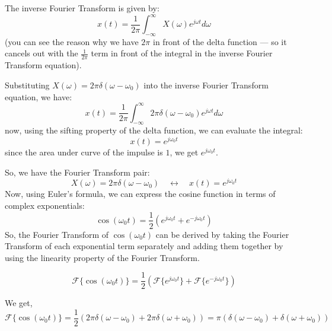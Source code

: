 The inverse Fourier Transform is given by:
\[
x(t) = \frac{1}{2\pi} \int_{-\infty}^{\infty} X(\omega) e^{j \omega t} d\omega
\]
(you can see the reason why we have $2\pi$ in front of the delta function --- so it cancels out with the $\frac{1}{2\pi}$ term in front of the integral in the inverse Fourier Transform equation).

Substituting \( X(\omega) = 2 \pi \delta(\omega - \omega_0) \) into the inverse Fourier Transform equation, we have:
\[
x(t) = \frac{1}{2\pi} \int_{-\infty}^{\infty} 2 \pi \delta(\omega - \omega_0) e^{j \omega t} d\omega
\]
now, using the sifting property of the delta function, we can evaluate the integral:
\[
x(t) = e^{j \omega_0 t}
\]
since the area under curve of the impulse is $1$, we get $e^{j \omega_0 t}$.

So, we have the Fourier Transform pair:
\[
X(\omega) = 2 \pi \delta(\omega - \omega_0) \quad \leftrightarrow \quad x(t) = e^{j \omega_0 t}
\]
Now, using Euler's formula, we can express the cosine function in terms of complex exponentials:
\[
\cos(\omega_0 t) = \frac{1}{2} \left( e^{j \omega_0 t} + e^{-j \omega_0 t} \right)
\]
So, the Fourier Transform of \( \cos(\omega_0 t) \) can be derived by taking the Fourier Transform of each exponential term separately and adding them together by using the linearity property of the Fourier Transform.

\[
\mathcal{F}\{ \cos(\omega_0 t) \} = \frac{1}{2} \left( \mathcal{F}\{ e^{j \omega_0 t} \} + \mathcal{F}\{ e^{-j \omega_0 t} \} \right)
\]

We get, 
\[
\mathcal{F}\{ \cos(\omega_0 t) \} = \frac{1}{2} \left( 2 \pi \delta(\omega - \omega_0) + 2 \pi \delta(\omega + \omega_0) \right) 
= \pi \left( \delta(\omega - \omega_0) + \delta(\omega + \omega_0) \right)
\]

